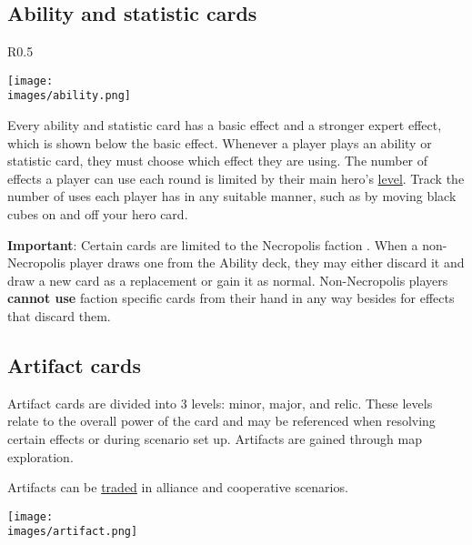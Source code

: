 \clearpage
\subsection*{\hypertarget{Ability}{Ability and statistic cards}}
\begin{wrapfigure}{R}{0.5\textwidth}

    \texttt{[image: \\images/ability.png]}

\end{wrapfigure}

Every ability and statistic card has a basic effect and a stronger expert  effect, which is shown below the basic effect.
Whenever a player plays an ability or statistic card, they must choose which effect they are using.
The number of  effects a player can use each round is limited by their main hero’s \hyperlink{Level}{level}.
Track the number of uses each player has in any suitable manner, such as by moving black cubes on and off your hero card.\par
\textbf{Important}: Certain cards are limited to the Necropolis faction .
When a non-Necropolis player draws one from the Ability deck, they may either discard it and draw a new card as a replacement or gain it as normal.
Non-Necropolis players \textbf{cannot use} faction specific cards from their hand in any way besides for effects that discard them.

\subsection*{Artifact cards}
Artifact cards are divided into 3 levels: minor, major, and relic.
These levels relate to the overall power of the card and may be referenced when resolving certain effects or during scenario set up.
Artifacts are gained through map exploration.\par
Artifacts can be \hyperlink{Trading}{traded} in alliance and cooperative scenarios.\par
\texttt{[image: \\images/artifact.png]}


\clearpage

